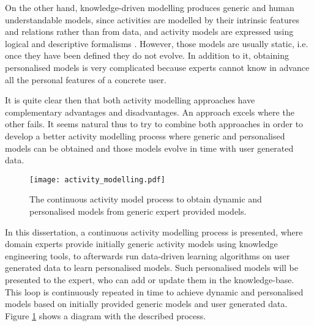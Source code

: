 
On the other hand, knowledge-driven modelling produces generic and human understandable models, since activities are modelled by their intrinsic features and relations rather than from data, and activity models are expressed using logical and descriptive formalisms \cite{Chen2012a}. However, those models are usually static, i.e. once they have been defined they do not evolve. In addition to it, obtaining personalised models is very complicated because experts cannot know in advance all the personal features of a concrete user. 


It is quite clear then that both activity modelling approaches have complementary advantages and disadvantages. An approach excels where the other fails. It seems natural thus to try to combine both approaches in order to develop a better activity modelling process where generic and personalised models can be obtained and those models evolve in time with user generated data. 

\begin{figure}[htbp]
\centering
\texttt{[image: activity\_modelling.pdf]}
    \caption{The continuous activity model process to obtain dynamic and personalised models from generic expert provided models.}
    \label{fig-activity-modelling}
\end{figure}

In this dissertation, a continuous activity modelling process is presented, where domain experts provide initially generic activity models using knowledge engineering tools, to afterwards run data-driven learning algorithms on user generated data to learn personalised models. Such personalised models will be presented to the expert, who can add or update them in the knowledge-base. This loop is continuously repeated in time to achieve dynamic and personalised models based on initially provided generic models and user generated data. Figure \ref{fig-activity-modelling} shows a diagram with the described process.

